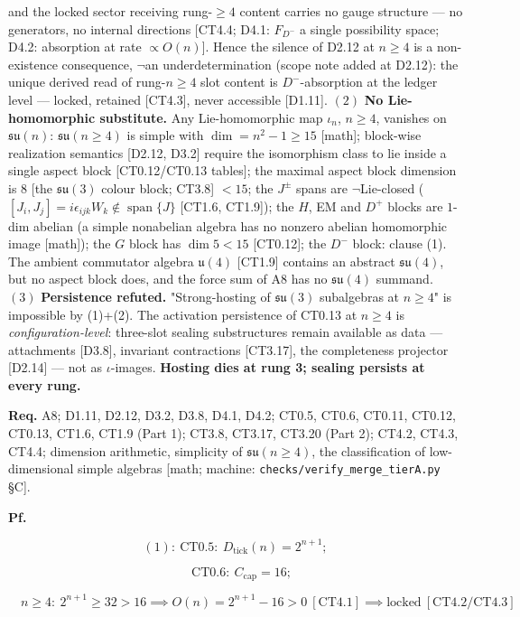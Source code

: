 \documentclass[11pt,openany]{report}
\theoremstyle{canonplain}
\theoremstyle{canondef}
\begin{document}
and the locked sector receiving rung-$\ge4$ content carries no gauge structure — no generators, no internal directions [CT4.4; D4.1: $F_{D^-}$ a single possibility space; D4.2: absorption at rate $\propto O(n)$]. Hence the silence of D2.12 at $n\ge4$ is a non-existence consequence, $\neg$an underdetermination (scope note added at D2.12): the unique derived read of rung-$n\ge4$ slot content is $D^-$-absorption at the ledger level — locked, retained [CT4.3], never accessible [D1.11]. $(2)$ \textbf{No Lie-homomorphic substitute.} Any Lie-homomorphic map $\iota_n$, $n\ge4$, vanishes on $\mathfrak{su}(n)$: $\mathfrak{su}(n\ge4)$ is simple with $\dim=n^2-1\ge15$ [math]; block-wise realization semantics [D2.12, D3.2] require the isomorphism class to lie inside a single aspect block [CT0.12/CT0.13 tables]; the maximal aspect block dimension is $8$ [the $\mathfrak{su}(3)$ colour block; CT3.8] $<15$; the $J^\pm$ spans are $\neg$Lie-closed ($[J_i,J_j]=i\epsilon_{ijk}W_k\notin\operatorname{span}\{J\}$ [CT1.6, CT1.9]); the $H$, EM and $D^+$ blocks are $1$-dim abelian (a simple nonabelian algebra has no nonzero abelian homomorphic image [math]); the $G$ block has $\dim5<15$ [CT0.12]; the $D^-$ block: clause (1). The ambient commutator algebra $\mathfrak u(4)$ [CT1.9] contains an abstract $\mathfrak{su}(4)$, but no aspect block does, and the force sum of A8 has no $\mathfrak{su}(4)$ summand. $(3)$ \textbf{Persistence refuted.} "Strong-hosting of $\mathfrak{su}(3)$ subalgebras at $n\ge4$" is impossible by (1)+(2). The activation persistence of CT0.13 at $n\ge4$ is \textit{configuration-level}: three-slot sealing substructures remain available as data — attachments [D3.8], invariant contractions [CT3.17], the completeness projector [D2.14] — not as $\iota$-images. \textbf{Hosting dies at rung 3; sealing persists at every rung.}

\textbf{Req.} A8; D1.11, D2.12, D3.2, D3.8, D4.1, D4.2; CT0.5, CT0.6, CT0.11, CT0.12, CT0.13, CT1.6, CT1.9 (Part 1); CT3.8, CT3.17, CT3.20 (Part 2); CT4.2, CT4.3, CT4.4; dimension arithmetic, simplicity of $\mathfrak{su}(n\ge4)$, the classification of low-dimensional simple algebras [math; machine: \texttt{checks/\allowbreak{}verify\_\allowbreak{}merge\_\allowbreak{}tierA.py} §C].

\textbf{Pf.}

\[
(1):\ \mathrm{CT0.5}:\ D_{\mathrm{tick}}(n)=2^{n+1};
\]

\[
\quad \mathrm{CT0.6}:\ C_{\mathrm{cap}}=16;
\]

\[
\quad n\ge4:\ 2^{n+1}\ge32>16\implies O(n)=2^{n+1}-16>0\ [\mathrm{CT4.1}]\implies\text{locked}\ [\mathrm{CT4.2}/\mathrm{CT4.3}]
\]
\end{document}
